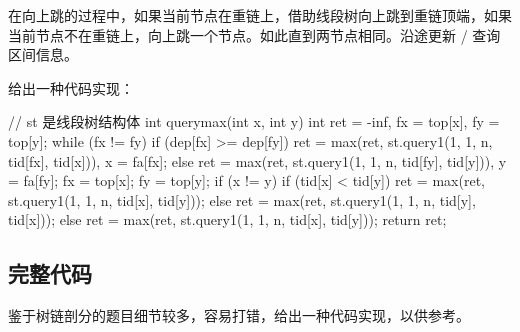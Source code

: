 在向上跳的过程中，如果当前节点在重链上，借助线段树向上跳到重链顶端，如果当前节点不在重链上，向上跳一个节点。如此直到两节点相同。沿途更新 / 查询区间信息。

给出一种代码实现：

\begin{cppcode}
// st 是线段树结构体
int querymax(int x, int y) {
  int ret = -inf, fx = top[x], fy = top[y];
  while (fx != fy) {
    if (dep[fx] >= dep[fy])
      ret = max(ret, st.query1(1, 1, n, tid[fx], tid[x])), x = fa[fx];
    else
      ret = max(ret, st.query1(1, 1, n, tid[fy], tid[y])), y = fa[fy];
    fx = top[x];
    fy = top[y];
  }
  if (x != y) {
    if (tid[x] < tid[y])
      ret = max(ret, st.query1(1, 1, n, tid[x], tid[y]));
    else
      ret = max(ret, st.query1(1, 1, n, tid[y], tid[x]));
  } else
    ret = max(ret, st.query1(1, 1, n, tid[x], tid[y]));
  return ret;
}
\end{cppcode}

\subsection{完整代码}

鉴于树链剖分的题目细节较多，容易打错，给出一种代码实现，以供参考。

